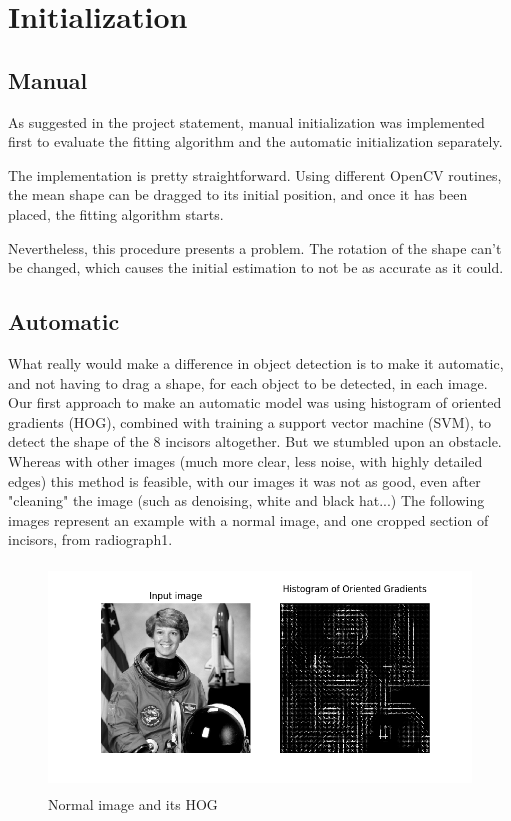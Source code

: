 \section{Initialization}

\subsection{Manual}
As suggested in the project statement, manual initialization
was implemented first to evaluate the fitting algorithm and
the automatic initialization separately.

The implementation is pretty straightforward. Using different
OpenCV routines, the mean shape can be dragged to its initial
position, and once it has been placed, the fitting algorithm starts.

Nevertheless, this procedure presents a problem. The rotation of the
shape can't be changed, which causes the initial estimation to not be
as accurate as it could.

\subsection{Automatic}

What really would make a difference in object detection is to make it automatic,
and not having to drag a shape, for each object to be detected, in each image.
Our first approach to make an automatic model was using histogram of oriented
gradients (HOG), combined with training a support vector machine (SVM), to
detect the shape of the 8 incisors altogether. But we stumbled upon an
obstacle. Whereas with other images (much more clear, less noise, with highly
detailed edges) this method is feasible, with our images it was not as good,
even after "cleaning" the image (such as denoising, white and
black hat...) The following images represent an example with a normal image, 
and one cropped section of incisors, from radiograph1.

\begin{figure}[h]
  \centering
  \includegraphics[height=6cm]{img/astro_hog}
  \caption{Normal image and its HOG}
\end{figure}

